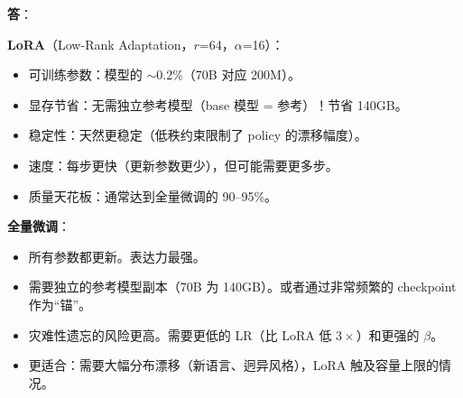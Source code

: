 \begin{questionbox}
\textbf{答}：

\textbf{LoRA}（Low-Rank Adaptation，$r$=64，$\alpha$=16）：

\begin{itemize}
  \item 可训练参数：模型的 $\sim$0.2\%（70B 对应 200M）。
  \item 显存节省：无需独立参考模型（base 模型 = 参考）！节省 140GB。
  \item 稳定性：天然更稳定（低秩约束限制了 policy 的漂移幅度）。
  \item 速度：每步更快（更新参数更少），但可能需要更多步。
  \item 质量天花板：通常达到全量微调的 90--95\%。
\end{itemize}

\textbf{全量微调}：

\begin{itemize}
  \item 所有参数都更新。表达力最强。
  \item 需要独立的参考模型副本（70B 为 140GB）。或者通过非常频繁的 checkpoint 作为“锚”。
  \item 灾难性遗忘的风险更高。需要更低的 LR（比 LoRA 低 $3\times$）和更强的 $\beta$。
  \item 更适合：需要大幅分布漂移（新语言、迥异风格），LoRA 触及容量上限的情况。
\end{itemize}


\end{questionbox}
